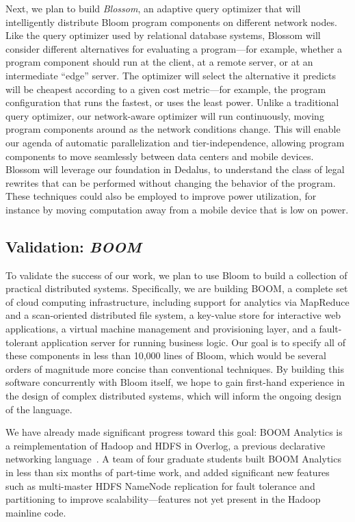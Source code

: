 Next, we plan to
build \emph{Blossom}, an adaptive query optimizer that will intelligently
distribute Bloom program components on different network nodes. Like the query
optimizer used by relational database systems, Blossom will consider different
alternatives for evaluating a program---for example, whether a program component
should run at the client, at a remote server, or at an intermediate ``edge''
server. The optimizer will select the alternative it predicts will be cheapest
according to a given cost metric---for example, the program configuration that
runs the fastest, or uses the least power. Unlike a traditional query optimizer,
our network-aware optimizer will run continuously, moving program components
around as the network conditions change. This will enable our agenda of
automatic parallelization and tier-independence, allowing program components to
move seamlessly between data centers and mobile devices. Blossom will leverage
our foundation in Dedalus, to understand the class of legal rewrites that can be
performed without changing the behavior of the program. These techniques could
also be employed to improve power utilization, for instance by moving
computation away from a mobile device that is low on power.


\subsection{Validation: \emph{BOOM}}
To validate the success of our work, we plan to use Bloom
to build a collection of practical distributed systems. Specifically,
we are building BOOM, a complete set of cloud computing
infrastructure, including support for analytics via MapReduce and a
scan-oriented distributed file system, a key-value store for
interactive web applications, a virtual machine management and
provisioning layer, and a fault-tolerant application server for
running business logic. Our goal is to specify all of these components
in less than 10,000 lines of Bloom, which would be several orders of
magnitude more concise than conventional techniques. By building this
software concurrently with Bloom itself, we hope to gain first-hand
experience in the design of complex distributed systems, which will
inform the ongoing design of the language.

We have already made significant progress toward this goal: BOOM Analytics is a
reimplementation of Hadoop and HDFS in Overlog, a previous declarative
networking language~\cite{boom-eurosys}. A team of four graduate students built
BOOM Analytics in less than six months of part-time work, and added significant
new features such as multi-master HDFS NameNode replication for fault tolerance
and partitioning to improve scalability---features not yet present in the Hadoop
mainline code.

